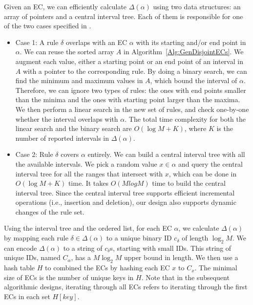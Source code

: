Given an EC, we can efficiently calculate $\Delta(\alpha)$ using two data structures: an array of pointers and a central interval tree.
Each of them is responsible for one of the two cases specified in \cite{FindIntersectionWiki}.
\begin{itemize}
\item Case 1: A rule $\delta$ overlaps with an EC $\alpha$ with its starting and/or end point in $\alpha$.
        We can reuse the sorted array $A$ in Algorithm~\ref{Alg:GenDisjointECs}.
        We augment each value, either a starting point or an end point of an interval in $A$ with a pointer to the corresponding rule.
        By doing a binary search, we can find the minimum and maximum values in $A$,
        which bound the interval of $\alpha$.
       Therefore, we can ignore two types of rules: the ones with end points smaller than the minima and the ones with starting point larger than the maxima.
        We then perform a linear search in the new set of rules, and check one-by-one whether the interval overlaps with $\alpha$.
        The total time complexity for both the linear search and the binary search are $O(\log M + K)$,
        where $K$ is the number of reported intervals in $\Delta(\alpha)$.

\item Case 2: Rule $\delta$ covers $\alpha$ entirely. We can build
        a central interval tree\cite{ComputationalGeometryBook} with all the available intervals.
        We pick a random value $x \in \alpha$ and query the central interval tree for
        all the ranges that intersect with $x$, which can be done in $O(\log M + K)$ time. It takes $O(M log M)$ time to build the central interval tree.
        Since the central interval tree supports efficient incremental operations (i.e., insertion and deletion), our design also supports dynamic changes of the rule set.
\end{itemize}

Using the interval tree and the ordered list, for each EC $\alpha$,
we calculate $\Delta(\alpha)$ by mapping each rule $\delta \in \Delta(\alpha)$ to a unique binary ID $c_\delta$ of length $\log_2 M$.
We can encode $\Delta(\alpha)$ to a string of $c_\delta$s, starting with small IDs.
This string of unique IDs, named $C_\alpha$, has a $M\log_2 M$ upper bound in length.
We then use a hash table $H$ to combined the ECs by hashing each EC $x$ to $C_x$.
The minimal size of ECs is the number of unique keys in $H$.
Note that in the subsequent algorithmic designs, iterating through all ECs refers to iterating through the first ECs in each set $H[key]$.%


